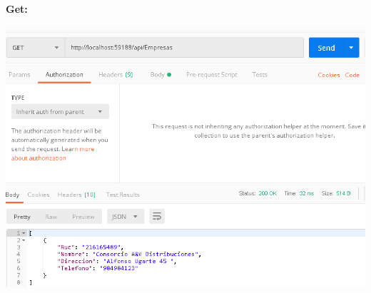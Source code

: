 \begin{flushleft}
\textbf{}\\
\textbf{}\\
\textbf{}\\
\textbf{}\\
\textbf{}\\
\textbf{Get:}\\
\begin{center}
	\includegraphics[width=19cm]{./Imagenes/get5} 
	\end{center}
\textbf{}\\
\end{flushleft}